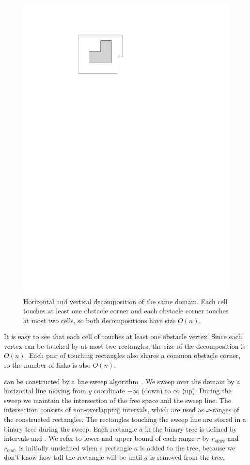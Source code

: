 \documentclass[english,gradu]{tktltiki2018}
\begin{document}
\begin{figure}
	\includegraphics[scale=0.6,page=3]{fig/decomp}
	\caption{Horizontal and vertical decomposition of the same domain. Each cell touches at least one obstacle corner and each obstacle corner touches at most two cells, so both decompositions have size $O(n)$.}\label{fig:decomp}
\end{figure}

It is easy to see that each cell of  touches at least one obstacle vertex.
Since each vertex can be touched by at most two rectangles, the size of the decomposition is $O(n)$.
Each pair of touching rectangles also shares a common obstacle corner, so the number of links is also $O(n)$.

 can be constructed by a line sweep algorithm~\cite{dasnar}.
We sweep over the domain by a horizontal line moving from $y$ coordinate $-\infty$ (down) to $\infty$ (up).
During the sweep we maintain the intersection of the free space \fspace and the sweep line.
The intersection consists of non-overlapping intervals, which are used as $x$-ranges of the constructed rectangles.
The rectangles touching the sweep line are stored in a binary tree during the sweep.
Each rectangle $a$ in the binary tree is defined by intervals  and .
We refer to lower and upper bound of each range $r$ by $r_{start}$ and $r_{end}$.
 is initially undefined when a rectangle $a$ is added to the tree, because we don't know how tall the rectangle will be until $a$ is removed from the tree.
\end{document}
